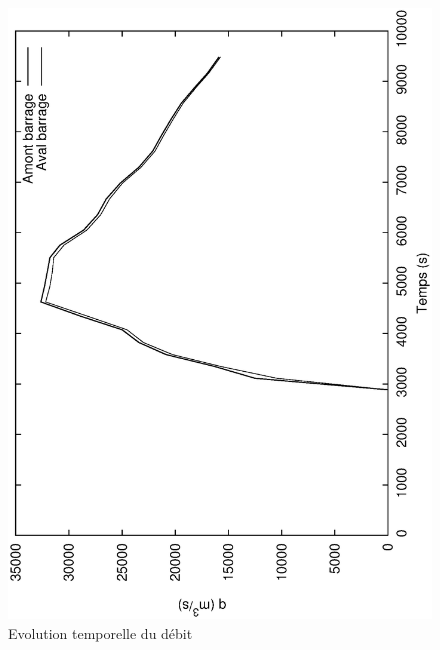 \documentclass[a4paper,10pt]{article}
\begin{document}
\begin{figure}
 \begin{center}
  \includegraphics[angle=270,width=15cm]{evol_deb.eps}
  \caption{Evolution temporelle du débit}
  \label{fig6}
 \end{center}
\end{figure}
\end{document}

